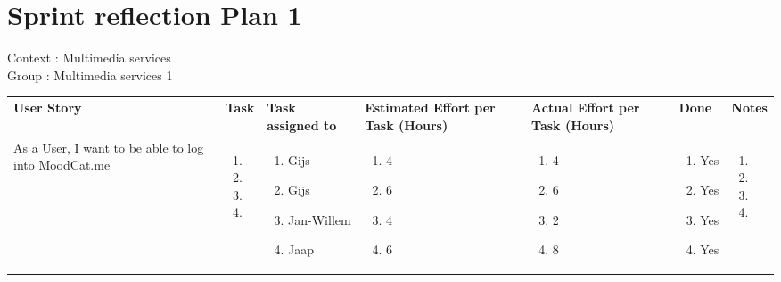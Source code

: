 \documentclass[11pt,a4paper,landscape]{article}
\begin{document}
\section*{Sprint reflection Plan 1}
Context : Multimedia services\\
Group : Multimedia services 1\\



\begin{table}[h]
\begin{tabular}{|p{5cm}|p{1.0cm}|p{2.5cm}|p{1.8cm}|p{1.8cm}|p{1.0cm}|p{12cm}}
\textbf{User Story} & \textbf{Task} & \textbf{Task assigned to} & \textbf{Estimated Effort per Task (Hours)} & \textbf{Actual Effort per Task (Hours)} & \textbf{Done} & \textbf{Notes}\\
As a User, I want to be able to log into MoodCat.me & \begin{enumerate}[leftmargin=0.3cm,itemindent=0.1cm]
\item 
\item
\item 
\item 
\end{enumerate}

& 
\begin{enumerate}[leftmargin=0.1cm,itemindent=0.1cm]
\item[] Gijs 
\item[] Gijs 
\item[] Jan-Willem 
\item[] Jaap  
\end{enumerate}

& 
\begin{enumerate}[leftmargin=0.1cm,itemindent=0.1cm]
\item[] 4 
\item[] 6 
\item[] 4 
\item[] 6 
\end{enumerate}
&
\begin{enumerate}[leftmargin=0.1cm,itemindent=0.1cm]
\item[] 4 
\item[] 6 
\item[] 2 
\item[] 8 
\end{enumerate}
&
\begin{enumerate}[leftmargin=0.1cm,itemindent=0.1cm]
\item[] Yes
\item[] Yes
\item[] Yes
\item[] Yes
\end{enumerate}
&
\begin{enumerate}[leftmargin=0.3cm,itemindent=0.1cm]
\item[]
\item[]
\item[]
\item[]
\end{enumerate}
 \\



\end{tabular}
\end{table}
\end{document}
